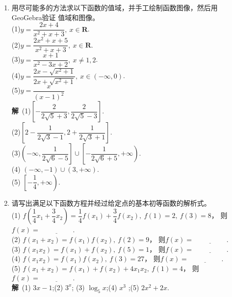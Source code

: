 \begin{enumerate}[label={\textbf{\arabic*.}},leftmargin=
    \inteval{\myenumleftmargin}pt]
\item 用尽可能多的方法求以下函数的值域，并手工绘制函数图像，然后用GeoGebra验证
值域和图像。\\
(1)$ y=\dfrac{2x+4}{x^2+x+3},\ x\in \textbf{R} $. \\
(2)$ y=\dfrac{2x^2+x+5}{x^2+x+3},\ x\in \textbf{R} $. \\
(3)$ y=\dfrac{x+1}{x^2-3x+2},\ x\neq 1,2 $. \\
(4)$ y=\dfrac{2x-\sqrt{x^2+1}}{2x+\sqrt{x^2+1}},\ x\in (-\infty,0) $. \\
(5)$ y=\dfrac{x}{(x-1)^2} $
\ifteach \\ \textbf{解}\ 
(1)$ \left[-\dfrac{2}{2\sqrt{5}+3},\dfrac{2}{2\sqrt{5}-3}\right] $. \\
(2)$ \left[2-\dfrac{1}{2\sqrt{3}-1},2+\dfrac{1}{2\sqrt{3}+1}\right] $. \\
(3)$ \left(-\infty,\dfrac{1}{2\sqrt{6}-5}\right] \cup 
\left[-\dfrac{1}{2\sqrt{6}+5},+\infty\right) $. \\
(4) $ \left(-\infty,-1\right) \cup \left(3,+\infty\right) $. \\
(5) $ \left[-\dfrac{1}{4},+\infty\right) $.
\fi

\item 请写出满足以下函数方程并经过给定点的基本初等函数的解析式。\\
(1) $ f\left(\dfrac{1}{4}x_1+\dfrac{3}{4}x_2\right)=\dfrac{1}{4}f(x_1)+
\dfrac{3}{4}f(x_2),\ f(1)=2,\ f(3)=8 $，
则$ f(x)=\underline{\hspace{2cm}} $. \\
(2) $ f(x_1+x_2)=f(x_1)f(x_2),\ f(2)=9 $，
则$ f(x)=\underline{\hspace{2cm}} $. \\
(3) $ f(x_1x_2)=f(x_1)+f(x_2),\ f(5)=1 $，
则$ f(x)=\underline{\hspace{2cm}} $. \\
(4) $ f(x_1x_2)=f(x_1)f(x_2),\ f(3)=27 $，
则$ f(x)=\underline{\hspace{2cm}} $. \\
(5) $ f(x_1+x_2)=f(x_1)+f(x_2)+4x_1x_2,\ f(1)=4 $，
则$ f(x)=\underline{\hspace{2cm}} $.
\ifteach \\
\textbf{解}\ (1) $ 3x-1 $;\quad (2) $ 3^x $;\quad 
(3) $ \log_5x $;\quad (4) $ x^3 $ ;\quad (5) $ 2x^2+2x $.
\fi


\end{enumerate}
